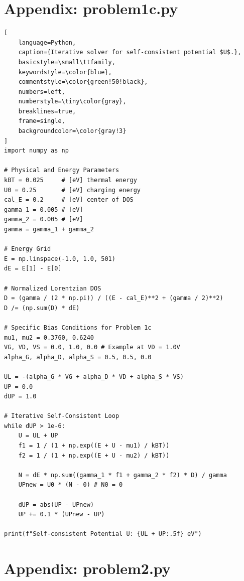 \documentclass[a4paper, 10pt]{article}
\begin{document}
\section*{Appendix: problem1c.py}
\label{appendix:calc_u}

\begin{lstlisting}[
    language=Python,
    caption={Iterative solver for self-consistent potential $U$.},
    basicstyle=\small\ttfamily,
    keywordstyle=\color{blue},
    commentstyle=\color{green!50!black},
    numbers=left,
    numberstyle=\tiny\color{gray},
    breaklines=true,
    frame=single,
    backgroundcolor=\color{gray!3}
]
import numpy as np

# Physical and Energy Parameters
kBT = 0.025     # [eV] thermal energy
U0 = 0.25       # [eV] charging energy
cal_E = 0.2     # [eV] center of DOS
gamma_1 = 0.005 # [eV]
gamma_2 = 0.005 # [eV]
gamma = gamma_1 + gamma_2

# Energy Grid
E = np.linspace(-1.0, 1.0, 501)
dE = E[1] - E[0]

# Normalized Lorentzian DOS
D = (gamma / (2 * np.pi)) / ((E - cal_E)**2 + (gamma / 2)**2)
D /= (np.sum(D) * dE)

# Specific Bias Conditions for Problem 1c
mu1, mu2 = 0.3760, 0.6240
VG, VD, VS = 0.0, 1.0, 0.0 # Example at VD = 1.0V
alpha_G, alpha_D, alpha_S = 0.5, 0.5, 0.0

UL = -(alpha_G * VG + alpha_D * VD + alpha_S * VS)
UP = 0.0
dUP = 1.0

# Iterative Self-Consistent Loop
while dUP > 1e-6:
    U = UL + UP
    f1 = 1 / (1 + np.exp((E + U - mu1) / kBT))
    f2 = 1 / (1 + np.exp((E + U - mu2) / kBT))

    N = dE * np.sum((gamma_1 * f1 + gamma_2 * f2) * D) / gamma
    UPnew = U0 * (N - 0) # N0 = 0

    dUP = abs(UP - UPnew)
    UP += 0.1 * (UPnew - UP)

print(f"Self-consistent Potential U: {UL + UP:.5f} eV")
\end{lstlisting}

\newpage
\section*{Appendix: problem2.py}
\label{appendix:mosfet_sim}
\end{document}
